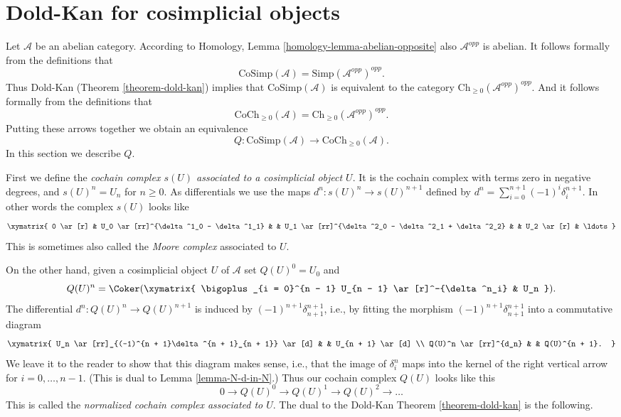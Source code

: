 \section{Dold-Kan for cosimplicial objects}
\label{section-dold-kan-cosimplicial}

\noindent
Let $\mathcal{A}$ be an abelian category.
According to Homology, Lemma \ref{homology-lemma-abelian-opposite}
also $\mathcal{A}^{opp}$ is abelian. It follows
formally from the definitions that
$$
\text{CoSimp}(\mathcal{A}) = \text{Simp}(\mathcal{A}^{opp})^{opp}.
$$
Thus Dold-Kan
(Theorem \ref{theorem-dold-kan})
implies that $\text{CoSimp}(\mathcal{A})$ is equivalent to
the category
$\text{Ch}_{\geq 0}(\mathcal{A}^{opp})^{opp}$. And it
follows formally from the definitions that
$$
\text{CoCh}_{\geq 0}(\mathcal{A}) =
\text{Ch}_{\geq 0}(\mathcal{A}^{opp})^{opp}.
$$
Putting these arrows together we obtain an equivalence
$$
Q :
\text{CoSimp}(\mathcal{A})
\longrightarrow
\text{CoCh}_{\geq 0}(\mathcal{A}).
$$
In this section we describe $Q$.

\medskip\noindent
First we define the
{\it cochain complex $s(U)$ associated to a cosimplicial
object $U$}. It is the cochain complex with terms zero in
negative degrees, and $s(U)^n = U_n$ for $n \geq 0$.
As differentials we use the maps
$d^n : s(U)^n \to s(U)^{n + 1}$ defined by
$d^n = \sum_{i = 0}^{n + 1} (-1)^i \delta^{n + 1}_i$.
In other words the complex $s(U)$ looks like
$$
\xymatrix{
0 \ar[r] &
U_0 \ar[rr]^{\delta^1_0 - \delta^1_1} & &
U_1 \ar[rr]^{\delta^2_0 - \delta^2_1 + \delta^2_2} & &
U_2 \ar[r] &
\ldots
}
$$
This is sometimes also called the {\it Moore complex} associated
to $U$.

\medskip\noindent
On the other hand, given a
cosimplicial object $U$ of $\mathcal{A}$ set
$Q(U)^0 = U_0$ and
$$
Q(U)^n = \Coker(
\xymatrix{
\bigoplus_{i = 0}^{n - 1} U_{n - 1} \ar[r]^-{\delta^n_i} &
U_n
}).
$$
The differential $d^n : Q(U)^n \to Q(U)^{n + 1}$
is induced by $(-1)^{n + 1}\delta^{n + 1}_{n + 1}$, i.e., by
fitting the morphism
$(-1)^{n + 1}\delta^{n + 1}_{n + 1}$
into a commutative
diagram
$$
\xymatrix{
U_n \ar[rr]_{(-1)^{n + 1}\delta^{n + 1}_{n + 1}} \ar[d] & &
U_{n + 1} \ar[d] \\
Q(U)^n \ar[rr]^{d_n} & &
Q(U)^{n + 1}.
}
$$
We leave it to the reader to show that this diagram makes
sense, i.e., that the image of $\delta^n_i$ maps into
the kernel of the right vertical arrow for $i = 0, \ldots, n - 1$.
(This is dual to Lemma \ref{lemma-N-d-in-N}.)
Thus our cochain complex $Q(U)$ looks like this
$$
0 \to Q(U)^0 \to Q(U)^1 \to Q(U)^2 \to \ldots
$$
This is called the {\it normalized cochain complex associated
to $U$}.
The dual to the Dold-Kan Theorem \ref{theorem-dold-kan} is the following.

